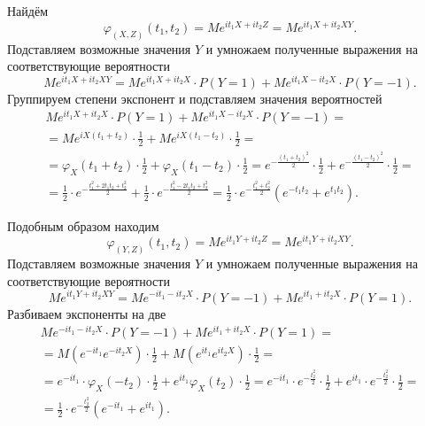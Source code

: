 Найдём
$$ \varphi_{ \left( X, Z \right) } \left( t_1, t_2 \right) =
  Me^{it_1 X + it_2 Z} =
  Me^{it_1 X + it_2 XY}.$$
Подставляем возможные значения $Y$ и умножаем полученные выражения на соответствующие вероятности
$$Me^{it_1 X + it_2 XY} =
  Me^{it_1X + it_2 X} \cdot P \left( Y = 1 \right) +
  Me^{it_1 X - it_2 X} \cdot P \left( Y = -1 \right).$$
Группируем степени экспонент и подставляем значения вероятностей
\begin{equation*}
  \begin{split}
    Me^{it_1X + it_2 X} \cdot P \left( Y = 1 \right) +
    Me^{it_1 X - it_2 X} \cdot P \left( Y = -1 \right) = \\
    = Me^{iX \left( t_1 + t_2 \right) } \cdot \frac{1}{2} +
    Me^{iX \left( t_1 - t_2 \right) } \cdot \frac{1}{2} = \\
    = \varphi_X \left( t_1 + t_2 \right) \cdot \frac{1}{2} +
    \varphi_X \left( t_1 - t_2 \right) \cdot \frac{1}{2} =
    e^{- \frac{ \left( t_1 + t_2 \right)^2}{2}} \cdot \frac{1}{2} +
    e^{- \frac{ \left( t_1 - t_2 \right)^2}{2}} \cdot \frac{1}{2} = \\
    = \frac{1}{2} \cdot e^{- \frac{t_1^2 + 2t_1 t_2 + t_2^2}{2}} +
    \frac{1}{2} \cdot e^{- \frac{t_1^2 - 2t_1 t_2 + t_2^2}{2}} =
    \frac{1}{2} \cdot e^{- \frac{t_1^2 + t_2^2}{2}} \left( e^{-t_1 t_2} + e^{t_1 t_2} \right).
  \end{split}
\end{equation*}

Подобным образом находим
$$ \varphi_{ \left( Y, Z \right) } \left( t_1, t_2 \right) =
  Me^{it_1 Y + it_2 Z} =
  Me^{it_1 Y + it_2 XY}.$$
Подставляем возможные значения $Y$ и умножаем полученные выражения на соответствующие вероятности
$$Me^{it_1 Y + it_2 XY} =
  Me^{-it_1 -it_2 X} \cdot P \left( Y = -1 \right) +
  Me^{it_1 + it_2 X} \cdot P \left( Y = 1 \right).$$
Разбиваем экспоненты на две
\begin{equation*}
  \begin{split}
    Me^{-it_1 -it_2 X} \cdot P \left( Y = -1 \right) +
    Me^{it_1 + it_2 X} \cdot P \left( Y = 1 \right) = \\
    = M \left( e^{-it_1} e^{-it_2 X} \right) \cdot \frac{1}{2} +
    M \left( e^{it_1} e^{it_2 X} \right) \cdot \frac{1}{2} = \\
    = e^{-it_1} \cdot \varphi_X \left( -t_2 \right) \cdot \frac{1}{2} +
    e^{it_1} \varphi_X \left( t_2 \right) \cdot \frac{1}{2} =
    e^{-it_1} \cdot e^{- \frac{t_2^2}{2}} \cdot \frac{1}{2} +
    e^{it_1} \cdot e^{- \frac{t_2^2}{2}} \cdot \frac{1}{2} = \\
    = \frac{1}{2} \cdot e^{- \frac{t_2^2}{2}} \left( e^{-it_1} + e^{it_1} \right).
  \end{split}
\end{equation*}

